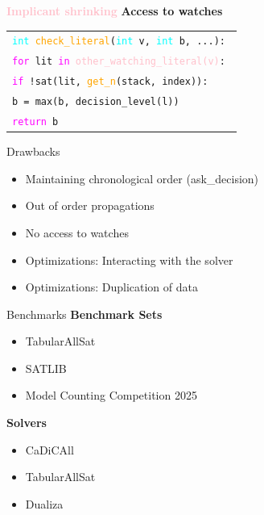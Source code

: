 \documentclass{beamer}
\begin{document}
\begin{frame}{\textcolor{pink}{\textbf{Implicant shrinking}}}
  \textbf{Access to watches}
  \begin{beamerbox}[Beispielbox]
    \begin{tabular}{l}
    \texttt{\textcolor{cyan}{int} \textcolor{orange}{check\_literal}(\textcolor{cyan}{int} v, \textcolor{cyan}{int} b, ...): } \\
    \texttt{\quad \textcolor{magenta}{for} lit \textcolor{magenta}{in} \textcolor{pink}{other\_watching\_literal(v)}:} \\
    \texttt{\quad \quad \textcolor{magenta}{if} !sat(lit, \textcolor{orange}{get\_n}(stack, index)):} \\
    \texttt{\quad \quad \quad b = max(b, decision\_level(l))} \\
    \texttt{\quad \textcolor{magenta}{return} b}
    \end{tabular}
  \end{beamerbox}
\end{frame}

\begin{frame}{Drawbacks}
  \begin{itemize}
    \item Maintaining chronological order (ask\_decision)
    \item Out of order propagations
    \item No access to watches
    \item Optimizations: Interacting with the solver
    \item Optimizations: Duplication of data
  \end{itemize}
\end{frame}

\begin{frame}{Benchmarks}
  \textbf{Benchmark Sets}
  \begin{itemize}
    \item TabularAllSat
    \item SATLIB
    \item Model Counting Competition 2025
  \end{itemize}
  \textbf{Solvers}
  \begin{itemize}
    \item CaDiCAll
    \item TabularAllSat
    \item Dualiza
  \end{itemize}
\end{frame}
\end{document}
